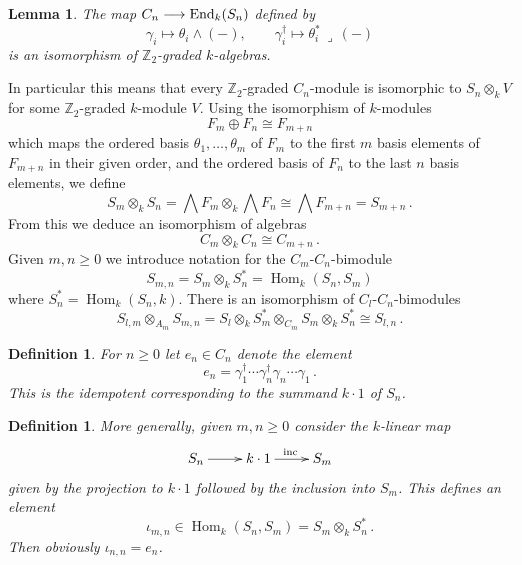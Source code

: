 \documentclass[english,letter paper,12pt,leqno]{article}
\newtheorem{lemma}[theorem]{Lemma}
\theoremstyle{example}
\newtheorem{definition}[theorem]{Definition}
\numberwithin{equation}{section}
\def\Hom{\operatorname{Hom}}
\DeclareMathOperator{\End}{End}
\begin{document}
\begin{lemma}\label{defn:spinorrep} The map $C_n \lto \End_k(S_n)$ defined by
\[
\gamma_i \mapsto \theta_i \wedge (-), \qquad \gamma_i^\dagger \mapsto \theta_i^*\, \lrcorner\, (-)
\]
is an isomorphism of $\mathbb{Z}_2$-graded $k$-algebras.
\end{lemma}

In particular this means that every $\mathbb{Z}_2$-graded $C_n$-module is isomorphic to $S_n \otimes_k V$ for some $\mathbb{Z}_2$-graded $k$-module $V$. Using the isomorphism of $k$-modules
\[
F_m \oplus F_n \cong F_{m+n}
\]
which maps the ordered basis $\theta_1,\ldots,\theta_m$ of $F_m$ to the first $m$ basis elements of $F_{m+n}$ in their given order, and the ordered basis of $F_n$ to the last $n$ basis elements, we define
\[
S_m \otimes_k S_n = \bigwedge F_m \otimes_k \bigwedge F_n \cong \bigwedge F_{m+n} = S_{m+n}\,.
\]
From this we deduce an isomorphism of algebras
\begin{equation}\label{eq:algebra_A_additive}
C_m \otimes_k C_n \cong C_{m+n}\,.
\end{equation}
Given $m, n \ge 0$ we introduce notation for the $C_m$-$C_n$-bimodule
\begin{equation}
S_{m,n} = S_m \otimes_k S_n^* = \Hom_k(S_n,S_m)
\end{equation}
where $S_n^* = \Hom_k(S_n, k)$. There is an isomorphism of $C_l$-$C_n$-bimodules
\begin{equation}\label{eq:isosbimodule}
S_{l,m} \otimes_{A_m} S_{m,n} = S_l \otimes_k S_m^* \otimes_{C_m} S_m \otimes_k S_n^* \cong S_{l,n}\,.
\end{equation}

\begin{definition}\label{defn:idempotent_e} For $n \ge 0$ let $e_n \in C_n$ denote the element
\[
e_n = \gamma_1^\dagger \cdots \gamma_n^\dagger \gamma_n \cdots \gamma_1\,.
\]
This is the idempotent corresponding to the summand $k \cdot 1$ of $S_n$.
\end{definition}

\begin{definition}\label{defn:idempotent_gen} More generally, given $m, n \ge 0$ consider the $k$-linear map
\[
\xymatrix{
S_n \ar[r] & k \cdot 1 \ar[r]^{\operatorname{inc}} & S_m
}
\]
given by the projection to $k \cdot 1$ followed by the inclusion into $S_m$. This defines an element
\[
\iota_{m,n} \in \Hom_k(S_n, S_m) = S_m \otimes_k S_n^*\,.
\]
Then obviously $\iota_{n,n} = e_n$.
\end{definition}
\end{document}
